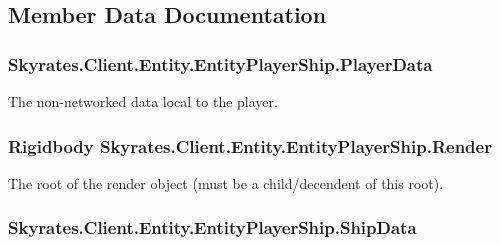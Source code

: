 \subsection{Member Data Documentation}
\hypertarget{class_skyrates_1_1_client_1_1_entity_1_1_entity_player_ship_a775f40dd5d6c89a50325eaa9dbd605b8}{
\subsubsection[{Player\-Data}]{ Skyrates.\-Client.\-Entity.\-Entity\-Player\-Ship.\-Player\-Data}}\label{class_skyrates_1_1_client_1_1_entity_1_1_entity_player_ship_a775f40dd5d6c89a50325eaa9dbd605b8}


The non-\/networked data local to the player. 

\hypertarget{class_skyrates_1_1_client_1_1_entity_1_1_entity_player_ship_a130c69b9a9c7d6e62bd609bf47c31630}{
\subsubsection[{Render}]{\setlength{\rightskip}{0pt plus 5cm}Rigidbody Skyrates.\-Client.\-Entity.\-Entity\-Player\-Ship.\-Render}}\label{class_skyrates_1_1_client_1_1_entity_1_1_entity_player_ship_a130c69b9a9c7d6e62bd609bf47c31630}


The root of the render object (must be a child/decendent of this root). 

\hypertarget{class_skyrates_1_1_client_1_1_entity_1_1_entity_player_ship_ab036683fcaa1c13312a06631dfff1b42}{
\subsubsection[{Ship\-Data}]{ Skyrates.\-Client.\-Entity.\-Entity\-Player\-Ship.\-Ship\-Data}}\label{class_skyrates_1_1_client_1_1_entity_1_1_entity_player_ship_ab036683fcaa1c13312a06631dfff1b42}


